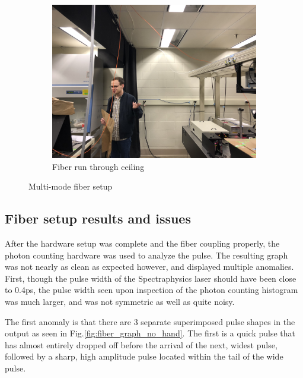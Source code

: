 \documentclass[a4paper]{article}
\begin{document}
\begin{figure}[!htb]
\begin{subfigure}[t]{0.4\textwidth}
         \includegraphics[width=\textwidth]{figures/IMG_6137.jpg}
         \caption{Fiber run through ceiling}
         \label{fig:fiber_ceiling}
         \begin{minipage}{2cm}
         \vfill
         \end{minipage}
     \end{subfigure}
        \caption{Multi-mode fiber setup}
        \label{fig:fiber}
\end{figure}

\subsection{Fiber setup results and issues}

After the hardware setup was complete and the fiber coupling properly, the photon counting hardware was used to analyze the pulse. The resulting graph was not nearly as clean as expected however, and displayed multiple anomalies. First, though the pulse width of the Spectraphysics laser should have been close to 0.4ps, the pulse width seen upon inspection of the photon counting histogram was much larger, and was not symmetric as well as quite noisy.

The first anomaly is that there are 3 separate superimposed pulse shapes in the output as seen in Fig.\ref{fig:fiber_graph_no_hand}. The first is a quick pulse that has almost entirely dropped off before the arrival of the next, widest pulse, followed by a sharp, high amplitude pulse located within the tail of the wide pulse. 
\end{document}
